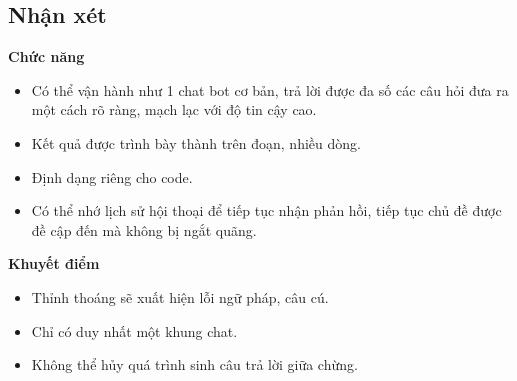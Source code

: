 \documentclass[a4paper, 12pt]{article}
\begin{document}
	\subsection{Nhận xét}
	\textbf{Chức năng}\\
	\begin{itemize}
		\item Có thể vận hành như 1 chat bot cơ bản, trả lời được đa số các câu hỏi đưa ra một cách rõ ràng, mạch lạc với độ tin cậy cao.
		\item Kết quả được trình bày thành trên đoạn, nhiều dòng.
		\item Định dạng riêng cho code.
		\item Có thể nhớ lịch sử hội thoại để tiếp tục nhận phản hồi, tiếp tục chủ đề được đề cập đến mà không bị ngắt quãng.
	\end{itemize}
	\vspace{1,5cm}
	\textbf{Khuyết điểm}\\
	\begin{itemize}
		\item Thỉnh thoáng sẽ xuất hiện lỗi ngữ pháp, câu cú.
		\item Chỉ có duy nhất một khung chat.
		\item Không thể hủy quá trình sinh câu trả lời giữa chừng.
	\end{itemize}
		
\end{document}
